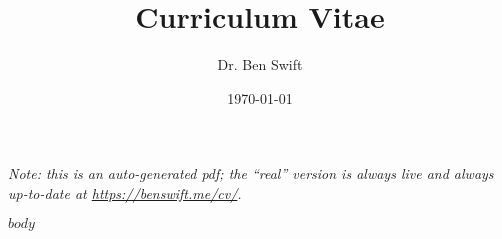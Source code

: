 \documentclass[a4paper,fontsize=12pt]{scrartcl}
\author{Dr. Ben Swift}
\date{\today}
\title{Curriculum Vitae}
\begin{document}
\maketitle

\emph{Note: this is an auto-generated pdf; the ``real'' version is always live
  and always up-to-date at \url{https://benswift.me/cv/}.}

$body$
\end{document}
